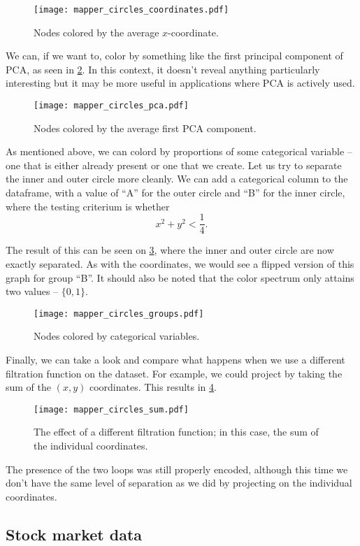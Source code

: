 \begin{figure}[h!]
  \centering
  \texttt{[image: mapper\_circles\_coordinates.pdf]}
  \caption{Nodes colored by the average $x$-coordinate.}
  \label{fig:mapper_circles_coordinates}
\end{figure}

We can, if we want to, color by something like the first principal component of PCA, as seen in \ref{fig:mapper_circles_pca}. In this context, it doesn't reveal anything particularly interesting but it may be more useful in applications where PCA is actively used.

\begin{figure}[h!]
  \centering
  \texttt{[image: mapper\_circles\_pca.pdf]}
  \caption{Nodes colored by the average first PCA component.}
  \label{fig:mapper_circles_pca}
\end{figure}

As mentioned above, we can colord by proportions of some categorical variable -- one that is either already present or one that we create. Let us try to separate the inner and outer circle more cleanly. We can add a categorical column to the dataframe, with a value of ``A'' for the outer circle and ``B'' for the inner circle, where the testing criterium is whether
\begin{equation*}
  x^{2} + y^{2} < \frac{1}{4}.
\end{equation*}

The result of this can be seen on \ref{fig:mapper_circles_groups}, where the inner and outer circle are now exactly separated. As with the coordinates, we would see a flipped version of this graph for group ``B''. It should also be noted that the color spectrum only attains two values -- $\{0, 1\}$.

\begin{figure}[h!]
  \centering
  \texttt{[image: mapper\_circles\_groups.pdf]}
  \caption{Nodes colored by categorical variables.}
  \label{fig:mapper_circles_groups}
\end{figure}

Finally, we can take a look and compare what happens when we use a different filtration function on the dataset. For example, we could project by taking the sum of the $(x,y)$ coordinates. This results in \ref{fig:mapper_circles_sum}.

\begin{figure}[h!]
  \centering
  \texttt{[image: mapper\_circles\_sum.pdf]}
  \caption{The effect of a different filtration function; in this case, the sum of the individual coordinates.}
  \label{fig:mapper_circles_sum}
\end{figure}

The presence of the two loops was still properly encoded, although this time we don't have the same level of separation as we did by projecting on the individual coordinates.

\subsection{Stock market data}
